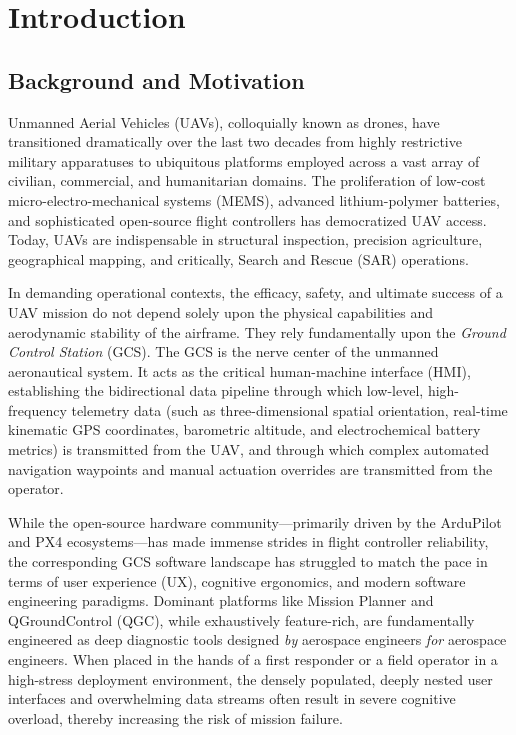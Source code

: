 \chapter{Introduction}

\section{Background and Motivation}
Unmanned Aerial Vehicles (UAVs), colloquially known as drones, have transitioned dramatically over the last two decades from highly restrictive military apparatuses to ubiquitous platforms employed across a vast array of civilian, commercial, and humanitarian domains. The proliferation of low-cost micro-electro-mechanical systems (MEMS), advanced lithium-polymer batteries, and sophisticated open-source flight controllers has democratized UAV access. Today, UAVs are indispensable in structural inspection, precision agriculture, geographical mapping, and critically, Search and Rescue (SAR) operations. 

In demanding operational contexts, the efficacy, safety, and ultimate success of a UAV mission do not depend solely upon the physical capabilities and aerodynamic stability of the airframe. They rely fundamentally upon the \textit{Ground Control Station} (GCS). The GCS is the nerve center of the unmanned aeronautical system. It acts as the critical human-machine interface (HMI), establishing the bidirectional data pipeline through which low-level, high-frequency telemetry data (such as three-dimensional spatial orientation, real-time kinematic GPS coordinates, barometric altitude, and electrochemical battery metrics) is transmitted from the UAV, and through which complex automated navigation waypoints and manual actuation overrides are transmitted from the operator.

While the open-source hardware community—primarily driven by the ArduPilot and PX4 ecosystems—has made immense strides in flight controller reliability, the corresponding GCS software landscape has struggled to match the pace in terms of user experience (UX), cognitive ergonomics, and modern software engineering paradigms. Dominant platforms like Mission Planner and QGroundControl (QGC), while exhaustively feature-rich, are fundamentally engineered as deep diagnostic tools designed \textit{by} aerospace engineers \textit{for} aerospace engineers. When placed in the hands of a first responder or a field operator in a high-stress deployment environment, the densely populated, deeply nested user interfaces and overwhelming data streams often result in severe cognitive overload, thereby increasing the risk of mission failure.

